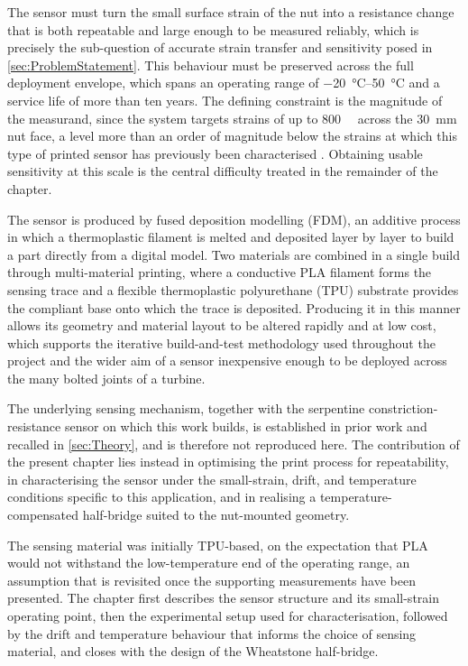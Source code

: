 The sensor must turn the small surface strain of the nut into a resistance change that is both repeatable and large enough to be measured reliably, which is precisely the sub-question of accurate strain transfer and sensitivity posed in \cref{sec:ProblemStatement}. This behaviour must be preserved across the full deployment envelope, which spans an operating range of \SIrange{-20}{50}{\celsius} and a service life of more than ten years. The defining constraint is the magnitude of the measurand, since the system targets strains of up to \SI{800}{\micro\strain} across the \SI{30}{\milli\meter} nut face, a level more than an order of magnitude below the strains at which this type of printed sensor has previously been characterised \cite{G.O.A.T}. Obtaining usable sensitivity at this scale is the central difficulty treated in the remainder of the chapter.

The sensor is produced by fused deposition modelling (FDM), an additive process in which a thermoplastic filament is melted and deposited layer by layer to build a part directly from a digital model. Two materials are combined in a single build through multi-material printing, where a conductive PLA filament forms the sensing trace and a flexible thermoplastic polyurethane (TPU) substrate provides the compliant base onto which the trace is deposited. Producing it in this manner allows its geometry and material layout to be altered rapidly and at low cost, which supports the iterative build-and-test methodology used throughout the project and the wider aim of a sensor inexpensive enough to be deployed across the many bolted joints of a turbine.
 
The underlying sensing mechanism, together with the serpentine constriction-resistance sensor on which this work builds, is established in prior work \cite{G.O.A.T} and recalled in \cref{sec:Theory}, and is therefore not reproduced here. The contribution of the present chapter lies instead in optimising the print process for repeatability, in characterising the sensor under the small-strain, drift, and temperature conditions specific to this application, and in realising a temperature-compensated half-bridge suited to the nut-mounted geometry.
 
The sensing material was initially TPU-based, on the expectation that PLA would not withstand the low-temperature end of the operating range, an assumption that is revisited once the supporting measurements have been presented. The chapter first describes the sensor structure and its small-strain operating point, then the experimental setup used for characterisation, followed by the drift and temperature behaviour that informs the choice of sensing material, and closes with the design of the Wheatstone half-bridge.

